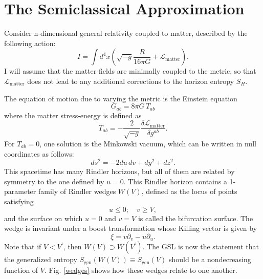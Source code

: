 \documentclass{article}
\begin{document}
\section{The Semiclassical Approximation}\label{semi}

Consider n-dimensional general relativity coupled to matter, described by the following action:
\begin{equation}\label{action}
I = \int d^4x (\sqrt{-g}\frac{R}{16\pi G} + \mathcal{L}_\mathrm{matter}).
\end{equation}
I will assume that the matter fields are minimally coupled to the metric, so that $\mathcal{L}_\mathrm{matter}$ does not lead to any additional corrections to the horizon entropy $S_H$.

The equation of motion due to varying the metric is the Einstein equation
\begin{equation}
G_{ab} = 8\pi G\,T_{ab}
\end{equation}
where the matter stress-energy is defined as
\begin{equation}\label{SE}
T_{ab} = -\frac{2}{\sqrt{-g}}\frac{\delta \mathcal{L}_\mathrm{matter}}{\delta g^{ab}}.
\end{equation}
For $T_{ab} = 0$, one solution is the Minkowski vacuum, which can be written in null coordinates as follows:
\begin{equation}\label{null}
ds^2 = -2 du\,dv + dy^2 + dz^2.
\end{equation}
This spacetime has many Rindler horizons, but all of them are related by symmetry to the one defined by $u = 0$.  This Rindler horizon contains a 1-parameter family of Rindler wedges $W(V)$, defined as the locus of points satisfying
\begin{equation}\label{wedge}
u \le 0; \quad v \ge V,
\end{equation}
and the surface on which $u = 0$ and $v = V$ is called the bifurcation surface.  The wedge is invariant under a boost transformation whose Killing vector is given by
\begin{equation}
\xi = v \partial_v - u \partial_u.
\end{equation}
Note that if 
$V < V^\prime$, then $W(V) \supset W(V^\prime)$.  The GSL is now the statement that the generalized entropy $S_\mathrm{gen}(W(V)) \equiv S_\mathrm{gen}(V)$ should be a nondecreasing function of $V$.  Fig. \ref{wedges} shows how these wedges relate to one another.
\end{document}
